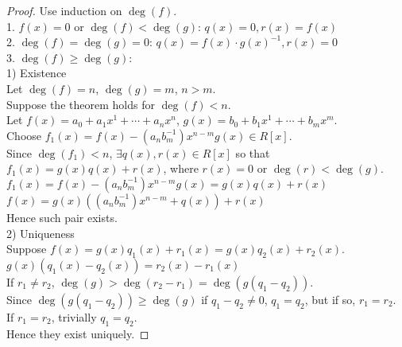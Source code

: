 \documentclass{report}
\begin{document}
		\begin{proof}
				Use induction on $\deg(f)$.\\
				1. $f(x)=0$ or $\deg(f)<\deg(g)$: $q(x)=0, r(x)=f(x)$\\
				2. $\deg(f)=\deg(g)=0$: $q(x)=f(x) \cdot g(x)^{-1}, r(x)=0$\\
				3. $\deg(f)\ge\deg(g)$:\\
				
				1) Existence\\
				Let $\deg(f)=n$, $\deg(g)=m$, $n>m$.\\
				Suppose the theorem holds for $\deg(f)<n$.\\
				Let $f(x)=a_0+a_1x^1+\cdots+a_nx^n$, $g(x)=b_0+b_1x^1+\cdots+b_mx^m$.\\
				Choose $f_1(x)=f(x)-(a_nb_m^{-1})x^{n-m}g(x)\in R[x]$.\\
				Since $\deg(f_1)<n$, $\exists q(x),r(x)\in R[x]$ so that $f_1(x)=g(x)q(x)+r(x)$, where $r(x)=0$ or $\deg(r)<\deg(g)$.\\
				$f_1(x)=f(x)-(a_nb_m^{-1})x^{n-m}g(x)=g(x)q(x)+r(x)$\\
				$f(x)=g(x)((a_nb_m^{-1})x^{n-m}+q(x))+r(x)$\\
				Hence such pair exists.\\
				
				2) Uniqueness\\
				Suppose $f(x)=g(x)q_1(x)+r_1(x)=g(x)q_2(x)+r_2(x)$.\\
				$g(x)(q_1(x)-q_2(x))=r_2(x)-r_1(x)$\\
				If $r_1 \ne r_2$, $\deg(g)>\deg(r_2-r_1)=\deg(g(q_1-q_2))$.\\
				Since $\deg(g(q_1-q_2))\ge\deg(g)$ if $q_1-q_2\ne0$, $q_1=q_2$, but if so, $r_1=r_2$.\\
				If $r_1=r_2$, trivially $q_1=q_2$.\\
				Hence they exist uniquely.
		\end{proof}
\end{document}
